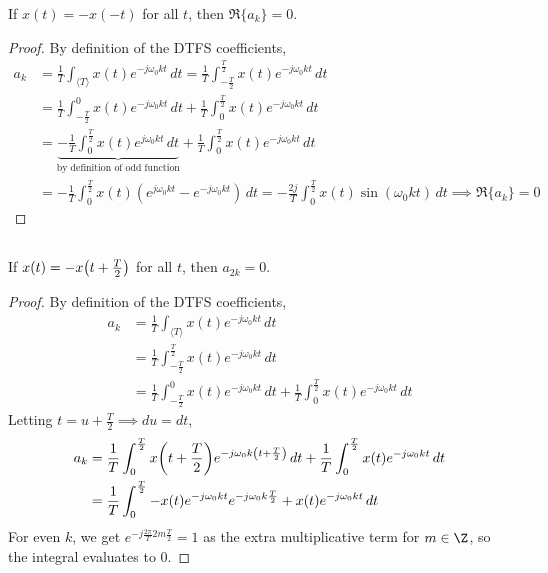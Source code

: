 \documentclass{article}
\begin{document}
\begin{theorem}
    If \(x(t) = -x(-t)\) for all \(t\), then \(\Re\{a_k\} = 0\).
\end{theorem}
\begin{proof}
    By definition of the DTFS coefficients,
    \begin{align}
        a_k &= \frac{1}{T} \int_{\langle T \rangle} x(t) e^{-j \omega_0 k t} \, dt = \frac{1}{T} \int_{-\frac{T}{2}}^{\frac{T}{2}} x(t) e^{-j \omega_0 k t} \, dt \\
        &= \frac{1}{T} \int_{-\frac{T}{2}}^0 x(t) e^{-j \omega_0 k t} \, dt + \frac{1}{T} \int_0^{\frac{T}{2}} x(t) e^{-j \omega_0 k t} \, dt \\
        &= \underbrace{-\frac{1}{T} \int_0^{\frac{T}{2}} x(t) e^{j \omega_0 k t} \, dt}_{\text{by definition of odd function}} + \frac{1}{T} \int_0^{\frac{T}{2}} x(t) e^{-j \omega_0 k t} \, dt \\
        &= -\frac{1}{T} \int_0^{\frac{T}{2}} x(t) (e^{j \omega_0 k t} - e^{-j \omega_0 k t}) \, dt = -\frac{2j}{T} \int_0^{\frac{T}{2}} x(t) \sin(\omega_0 k t) \, dt \implies \Re\{a_k\} = 0
    \end{align}
\end{proof}

\subsection{}

\begin{theorem}
    If \(x(t) = -x\qty(t + \frac{T}{2})\) for all \(t\), then \(a_{2k} = 0\).
\end{theorem}
\begin{proof}
    By definition of the DTFS coefficients,
    \begin{align}
        a_k &= \frac{1}{T} \int_{\langle T \rangle} x(t) e^{-j \omega_0 k t} \, dt \\
        &= \frac{1}{T} \int_{-\frac{T}{2}}^{\frac{T}{2}} x(t) e^{-j \omega_0 k t} \, dt \\
        &= \frac{1}{T} \int_{-\frac{T}{2}}^0 x(t) e^{-j \omega_0 k t} \, dt + \frac{1}{T} \int_0^{\frac{T}{2}} x(t) e^{-j \omega_0 k t} \, dt
    \end{align}
    Letting \(t = u + \frac{T}{2} \implies du = dt\),
    \begin{align}
        a_k &= \frac{1}{T} \int_0^{\frac{T}{2}} x\qty(t + \frac{T}{2}) e^{-j \omega_0 k \qty(t + \frac{T}{2})} \, dt + \frac{1}{T} \int_0^{\frac{T}{2}} x(t) e^{-j \omega_0 k t} \, dt \\
        &= \frac{1}{T} \int_0^{\frac{T}{2}} -x(t) e^{-j \omega_0 k t} e^{-j \omega_0 k \frac{T}{2}} + x(t) e^{-j \omega_0 k t} \, dt
    \end{align}
    For even \(k\), we get \(e^{-j \frac{2\pi}{T} 2m \frac{T}{2}} = 1\) as the extra multiplicative term for \(m \in \Z\), so the integral evaluates to \(0\).
\end{proof}
\end{document}
